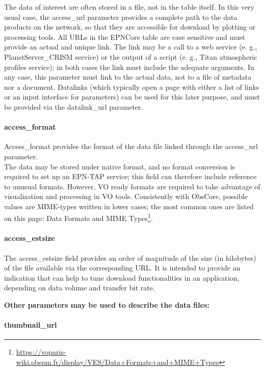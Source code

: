 \documentclass[11pt,a4paper]{ivoa}
\begin{document}
The data of interest are often stored in a file, not in the table itself. In this very usual case, the access\_url parameter provides a complete path to the data products on the network, so that they are accessible for download by plotting or processing tools. All URLs in the EPNCore table are case sensitive and must provide an actual and unique link. The link may be a call to a web service (e. g., PlanetServer\_CRISM service) or the output of a script (e. g., Titan atmospheric profiles service); in both cases the link must include the adequate arguments. In any case, this parameter must link to the actual data, not to a file of metadata nor a document. Datalinks (which typically open a page with either a list of links or an input interface for parameters) can be used for this later purpose, and must be provided via the datalink\_url parameter. 

\paragraph{access\_format}

Access\_format provides the format of the data file linked through the access\_url parameter. \\The data may be stored under native format, and no format conversion is required to set up an EPN-TAP service; this field can therefore include reference to unusual formats. However, VO ready formats are required to take advantage of visualization and processing in VO tools. Consistently with ObsCore, possible values are MIME-types written in lower cases; the most common ones are listed on this page: Data Formats and MIME Types\footnote{\url{https://voparis-wiki.obspm.fr/display/VES/Data+Formats+and+MIME+Types}}.

\paragraph{access\_estsize}

The access\_estsize field provides an order of magnitude of the size (in kilobytes) of the file available via the corresponding URL. It is intended to provide an indication that can help to tune download functionalities in an application, depending on data volume and transfer bit rate.


\textbf{Other parameters may be used to describe the data files:}

\paragraph{thumbnail\_url}
\end{document}
